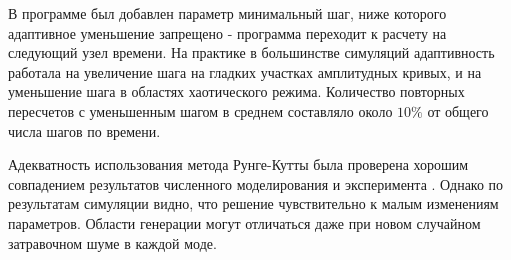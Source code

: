 В программе был добавлен параметр минимальный шаг, ниже которого адаптивное уменьшение запрещено - программа переходит к расчету на следующий узел времени. На практике в большинстве симуляций адаптивность работала на увеличение шага на гладких участках амплитудных кривых, и на уменьшение шага в областях хаотического режима. Количество повторных пересчетов с уменьшенным шагом в среднем составляло около $10\%$ от общего числа шагов по времени.

Адекватность использования метода Рунге-Кутты была проверена хорошим совпадением результатов численного моделирования и эксперимента \cite{Herr2014}. Однако по результатам симуляции видно, что решение чувствительно к малым изменениям параметров. Области генерации могут отличаться даже при новом случайном затравочном шуме в каждой моде.

